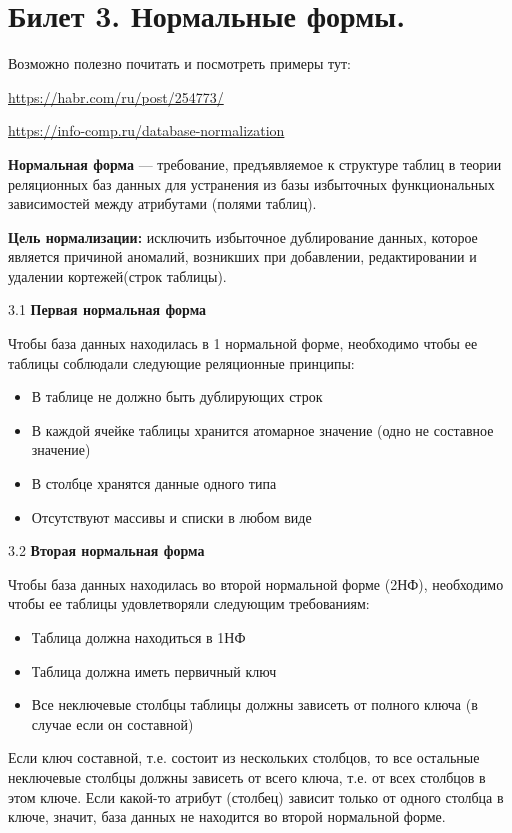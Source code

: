 \newpage
\section {Билет 3. Нормальные формы.}

Возможно полезно почитать и посмотреть примеры тут:

\url{https://habr.com/ru/post/254773/} 

\url{https://info-comp.ru/database-normalization}

\textbf{Нормальная форма} — требование, предъявляемое к структуре таблиц в теории реляционных баз данных для устранения из базы избыточных функциональных зависимостей между атрибутами (полями таблиц).

\textbf{Цель нормализации:} исключить избыточное дублирование данных, которое является причиной аномалий, возникших при добавлении, редактировании и удалении кортежей(строк таблицы).

3.1 \textbf{Первая нормальная форма}

Чтобы база данных находилась в 1 нормальной форме, необходимо чтобы ее таблицы соблюдали следующие реляционные принципы:

\begin{itemize}
	\item В таблице не должно быть дублирующих строк
	\item В каждой ячейке таблицы хранится атомарное значение (одно не составное значение)
	\item В столбце хранятся данные одного типа
	\item Отсутствуют массивы и списки в любом виде
\end{itemize}

3.2 \textbf{Вторая нормальная форма}

Чтобы база данных находилась во второй нормальной форме (2НФ), необходимо чтобы ее таблицы удовлетворяли следующим требованиям:

\begin{itemize}
	\item Таблица должна находиться в 1НФ
	\item Таблица должна иметь первичный ключ
	\item Все неключевые столбцы таблицы должны зависеть от полного ключа (в случае если он составной)
\end{itemize}

Если ключ составной, т.е. состоит из нескольких столбцов, то все остальные неключевые столбцы должны зависеть от всего ключа, т.е. от всех столбцов в этом ключе. Если какой-то атрибут (столбец) зависит только от одного столбца в ключе, значит, база данных не находится во второй нормальной форме.


